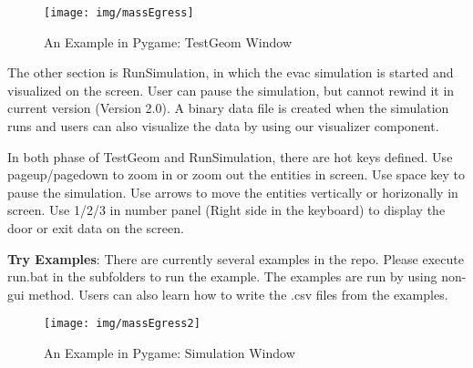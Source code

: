 \documentclass[english]{article}
\begin{document}
\begin{figure}
\centerline{\texttt{[image: img/massEgress]}} \caption{An Example in Pygame: TestGeom Window}

\label{Fig_Example_TestGeom} 
\end{figure}

The other section is RunSimulation, in which the evac simulation is
started and visualized on the screen. User can pause the simulation,
but cannot rewind it in current version (Version 2.0). A binary data
file is created when the simulation runs and users can also visualize
the data by using our visualizer component. 

In both phase of TestGeom and RunSimulation, there are hot keys defined.
Use pageup/pagedown to zoom in or zoom out the entities in screen.
Use space key to pause the simulation. Use arrows to move the entities
vertically or horizonally in screen. Use 1/2/3 in number panel (Right
side in the keyboard) to display the door or exit data on the screen.

\textbf{Try Examples}: There are currently several examples in the repo.
Please execute run.bat in the subfolders to run the example. The examples
are run by using non-gui method. Users can also learn how to write
the .csv files from the examples.

\begin{figure}
\centerline{\texttt{[image: img/massEgress2]}}
\caption{An Example in Pygame: Simulation Window}

\label{Fig_Example_Sim} 
\end{figure}



\clearpage{}

\newpage{}

\end{document}
